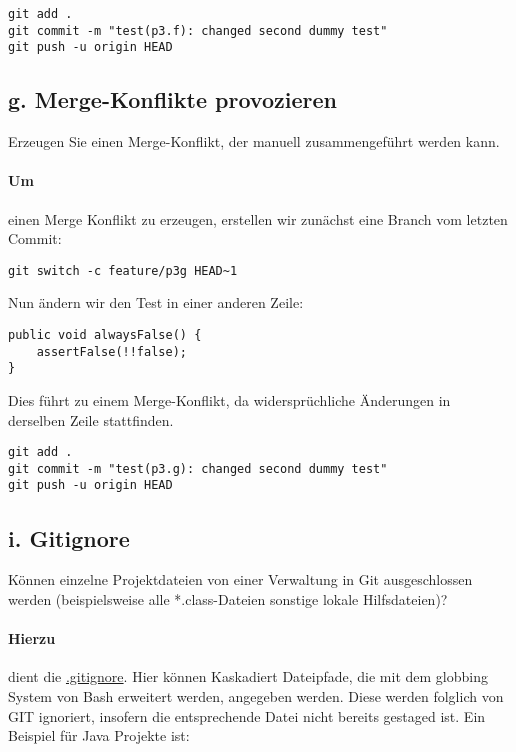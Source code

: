 \begin{lstlisting}[label={lst:commit-change-false-test}, caption={Commiten einer Änderung ohne Mergekonflikte}]
git add .
git commit -m "test(p3.f): changed second dummy test"
git push -u origin HEAD
\end{lstlisting}

\subsection{g. Merge-Konflikte provozieren}\label{subsec:g.-merge-konflikte-provozieren}
Erzeugen Sie einen Merge-Konflikt, der manuell zusammengeführt werden kann.

\paragraph{Um} einen Merge Konflikt zu erzeugen, erstellen wir zunächst eine Branch vom letzten Commit:
\begin{lstlisting}[label={lst:create-p3g},caption={Erstellen einer neuen Branch mit Mergekonflikten}]
git switch -c feature/p3g HEAD~1
\end{lstlisting}

Nun ändern wir den Test in einer anderen Zeile:

\begin{lstlisting}[label={lst:double-negative-false-test}, caption={Erstellen einer Änderung mit Mergekonflikten}]
public void alwaysFalse() {
    assertFalse(!!false);
}
\end{lstlisting}

Dies führt zu einem Merge-Konflikt, da widersprüchliche Änderungen in derselben Zeile stattfinden.

\begin{lstlisting}[label={lst:commit-p3g}, caption={Committen einer Änderung mit Mergekonflikten}]
git add .
git commit -m "test(p3.g): changed second dummy test"
git push -u origin HEAD
\end{lstlisting}

\subsection{i. Gitignore}\label{subsec:i.-gitignore}
Können einzelne Projektdateien von einer Verwaltung in Git ausgeschlossen werden (beispielsweise alle *.class-Dateien sonstige lokale Hilfsdateien)?

\paragraph{Hierzu} dient die \href{https://git-scm.com/docs/gitignore}{.gitignore}.
Hier können Kaskadiert Dateipfade, die mit dem globbing System von Bash erweitert werden, angegeben werden.
Diese werden folglich von GIT ignoriert, insofern die entsprechende Datei nicht bereits gestaged ist.
Ein Beispiel für Java Projekte ist:


